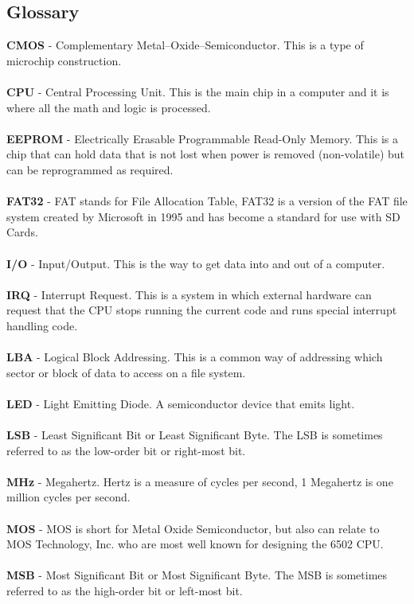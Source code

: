 \documentclass{ol-softwaremanual}
\begin{document}
\begin{ffcode}
\section{Glossary}
\textbf{CMOS} - Complementary Metal–Oxide–Semiconductor. This is a type of microchip construction.\\
\\
\textbf{CPU} - Central Processing Unit. This is the main chip in a computer and it is where all the math and logic is processed. \\
\\
\textbf{EEPROM} - Electrically Erasable Programmable Read-Only Memory. This is a chip that can hold data that is not lost when power is removed (non-volatile) but can be reprogrammed as required.\\
\\
\textbf{FAT32} - FAT stands for File Allocation Table, FAT32 is a version of the FAT file system created by Microsoft in 1995 and has become a standard for use with SD Cards.\\
\\
\textbf{I/O} - Input/Output. This is the way to get data into and out of a computer.\\
\\
\textbf{IRQ} - Interrupt Request. This is a system in which external hardware can request that the CPU stops running the current code and runs special interrupt handling code.\\
\\
\textbf{LBA} - Logical Block Addressing. This is a common way of addressing which sector or block of data to access on a file system.\\
\\
\textbf{LED} - Light Emitting Diode. A semiconductor device that emits light. \\
\\
\textbf{LSB} - Least Significant Bit or Least Significant Byte. The LSB is sometimes referred to as the low-order bit or right-most bit.\\
\\
\textbf{MHz} - Megahertz. Hertz is a measure of cycles per second, 1 Megahertz is one million cycles per second.\\
\\
\textbf{MOS} - MOS is short for Metal Oxide Semiconductor, but also can relate to MOS Technology, Inc. who are most well known for designing the 6502 CPU.\\
\\
\textbf{MSB} - Most Significant Bit or Most Significant Byte. The MSB is sometimes referred to as the high-order bit or left-most bit.\\

\end{ffcode}
\end{document}
